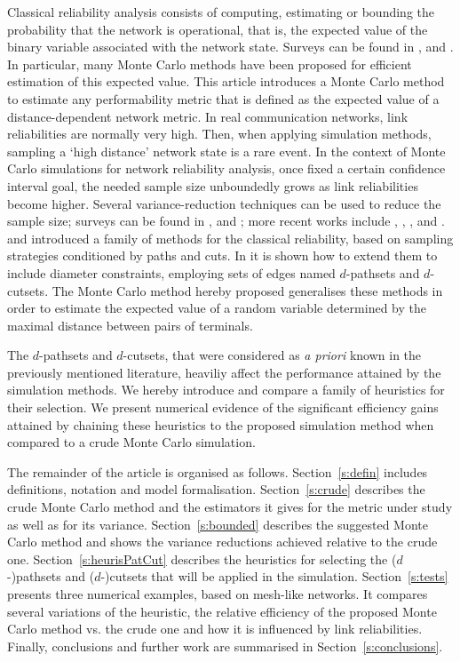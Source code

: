 \documentclass[a4paper]{article}
\begin{document}
Classical reliability analysis consists of computing, estimating or bounding the probability that the network is operational, that is, the expected value of the binary variable associated with the network state. Surveys can be found in \cite{Colbourn87}, \cite{Rub96} and \cite{Petingi2008}. In particular, many Monte Carlo methods have been proposed for efficient estimation of this expected value. This article introduces a Monte Carlo method to estimate any performability metric that is defined as the expected value of a distance-dependent network metric. In real communication networks, link reliabilities are normally very high. Then, when applying simulation methods, sampling a `high distance' network state is a rare event. In the context of Monte Carlo simulations for network reliability analysis, once fixed a certain confidence interval goal, the needed sample size unboundedly grows as link reliabilities become higher. Several variance-reduction techniques can be used to reduce the sample size; surveys can be found in \cite{rubino2009rare}, \cite{Can-ElKha-Rub-2009} and \cite{Gertsbakh2009}; more recent works include \cite{Can-LEcu-Lee-Rub-Tuf-2009}, \cite{Can-LEcu-Rub-Tuf-2010}, \cite{LEcu-Rub-Sag-Tuf-2011}, \cite{Zenklusen-Laumanns-2011} and \cite{Bot-LEcu-Rub-Sim-Tuf-2012}. \cite{KTI1977} and \cite{Fishman1986} introduced a family of methods for the classical reliability, based on sampling strategies conditioned by paths and cuts. In \cite{SartorCOMCOM2012} it is shown how to extend them to include diameter constraints, employing sets of edges named $d$-pathsets and $d$-cutsets. The Monte Carlo method hereby proposed generalises these methods in order to estimate the expected value of a random variable determined by the maximal distance between pairs of terminals.

The $d$-pathsets and $d$-cutsets, that were considered as \emph{a priori} known in the previously mentioned literature, heaviliy affect the performance attained by the simulation methods. We hereby introduce and compare a family of heuristics for their selection. We present numerical evidence of the significant efficiency gains attained by chaining these heuristics to the proposed simulation method when compared to a crude Monte Carlo simulation. 

The remainder of the article is organised as follows. Section~\ref{s:defin} includes definitions, notation and model formalisation. Section~\ref{s:crude} describes the crude Monte Carlo method and the estimators it gives for the metric under study as well as for its variance. Section~\ref{s:bounded} describes the suggested Monte Carlo method and shows the variance reductions achieved relative to the crude one. Section~\ref{s:heurisPatCut} describes the heuristics for selecting the ($d$-)pathsets and ($d$-)cutsets that will be applied in the simulation. Section~\ref{s:tests} presents three numerical examples, based on mesh-like networks. It compares several variations of the heuristic, the relative efficiency of the proposed Monte Carlo method vs. the crude one and how it is influenced by link reliabilities. Finally, conclusions and further work are summarised in Section~\ref{s:conclusions}.
\end{document}
